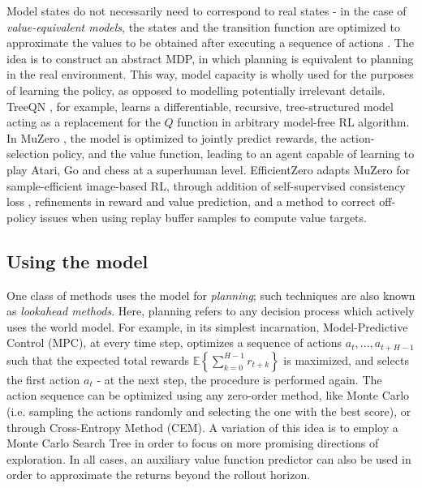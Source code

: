 \documentclass[en]{pracamgr}
\begin{document}
Model states do not necessarily need to correspond to real states - in the case of \emph{value-equivalent models}, the states and the transition function are optimized to approximate the values to be obtained after executing a sequence of actions \autocite{silverPredictronEndToEndLearning2017}. The idea is to construct an abstract MDP, in which planning is equivalent to planning in the real environment. This way, model capacity is wholly used for the purposes of learning the policy, as opposed to modelling potentially irrelevant details. TreeQN \autocite{farquharTreeQNATreeCDifferentiable2018}, for example, learns a differentiable, recursive, tree-structured model acting as a replacement for the $Q$ function in arbitrary model-free RL algorithm. In MuZero \autocite{schrittwieserMasteringAtariGo2020}, the model is optimized to jointly predict rewards, the action-selection policy, and the value function, leading to an agent capable of learning to play Atari, Go and chess at a superhuman level. EfficientZero \autocite{yeMasteringAtariGames2021} adapts MuZero for sample-efficient image-based RL, through addition of self-supervised consistency loss \autocite{chenExploringSimpleSiamese2020}, refinements in reward and value prediction, and a method to correct off-policy issues when using replay buffer samples to compute value targets.

\subsection{Using the model}

One class of methods uses the model for \emph{planning}; such techniques are also known as \emph{lookahead methods}. Here, planning refers to any decision process which actively uses the world model. For example, in its simplest incarnation, Model-Predictive Control (MPC), at every time step, optimizes a sequence of actions $a_t, \ldots, a_{t+H-1}$ such that the expected total rewards $\mathbb{E}\left\{\sum_{k=0}^{H-1} r_{t+k} \right\}$ is maximized, and selects the first action $a_t$ - at the next step, the procedure is performed again. The action sequence can be optimized using any zero-order method, like Monte Carlo (i.e. sampling the actions randomly and selecting the one with the best score), or through Cross-Entropy Method (CEM). A variation of this idea is to employ a Monte Carlo Search Tree in order to focus on more promising directions of exploration. In all cases, an auxiliary value function predictor can also be used in order to approximate the returns beyond the rollout horizon.
\end{document}
